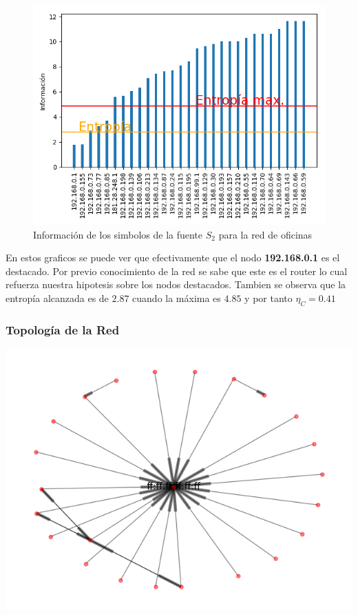 \begin{figure}
 \centering
 \includegraphics[scale=0.6]{../plots/trabajo_s2_informacion.png}
 \caption{Información de los simbolos de la fuente $S_2$ para la red de oficinas}
\end{figure}

En estos graficos se puede ver que efectivamente que el nodo \textbf{192.168.0.1}
es el destacado. Por previo conocimiento de la red se sabe que este
es el router lo cual refuerza nuestra hipotesis sobre los nodos destacados.
Tambien se observa que la entropía alcanzada es de $2.87$ cuando la máxima
es $4.85$ y por tanto $\eta_{C} = 0.41$

\clearpage
\subsubsection{Topolog\'ia de la Red}
\begin{center}
 \includegraphics[scale=0.6]{../plots/trabajo_s2_topologia.png}
\end{center}

